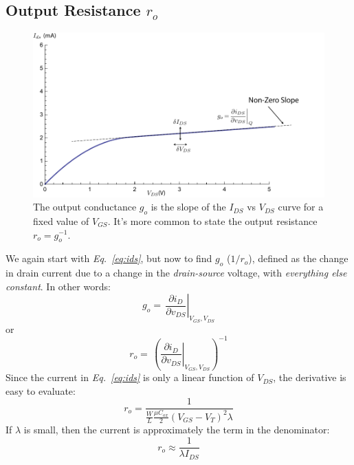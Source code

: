 \subsection{Output Resistance \texorpdfstring{$r_o$}{}}
\begin{figure}[tb]
\centering
\includegraphics[width=.75\columnwidth]{ids_idsat_ro}
\caption{The output conductance $g_o$ is the slope of the $I_{DS}$ vs $V_{DS}$ curve for a fixed value of $V_{GS}$.  It's more common to state the output resistance $r_o = g_o^{-1}$.}
\label{fig:ids_idsat_ro}
\end{figure}
We again start with \emph{Eq.~\ref{eq:ids}}, but now to find $g_o$ ($1/r_o$), defined as the change in drain current due to a change in the \textit{drain-source} voltage, with \textit{everything else constant}.  In other words:
    \begin{equation}
        {g_o} = \,{ {{{\left. {\frac{{\partial {i_D}}}{{\partial {v_{DS}}}}} \right|}_{{V_{GS}},{V_{DS}}}}} }
    \end{equation}
or
    \begin{equation}
        {r_o} = \,{\left( {{{\left. {\frac{{\partial {i_D}}}{{\partial {v_{DS}}}}} \right|}_{{V_{GS}},{V_{DS}}}}} \right)^{ - 1}}
    \end{equation}
Since the current in \emph{Eq.~\ref{eq:ids}} is only a linear function of $V_{DS}$, the derivative is easy to evaluate:
    \begin{equation}
        {r_o} = \frac{1}{{\frac{W}{L}\frac{{\mu {C_{ox}}}}{2}{{({V_{GS}} - {V_T})}^2}\lambda }}
    \end{equation}
If $\lambda$ is small, then the current is approximately the term in the denominator:
    \begin{equation}
        {r_o} \approx \frac{1}{{\lambda {I_{DS}}}}
    \end{equation}

